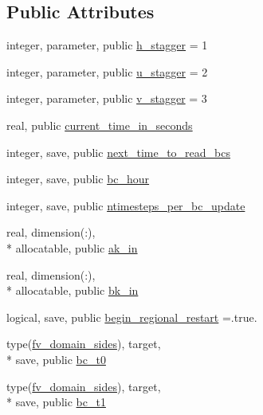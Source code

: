 \subsection*{Public Attributes}
\begin{DoxyCompactItemize}
\item 
integer, parameter, public \hyperlink{classfv__regional__mod_ab84d267f8311598530c8783263ad1bc8}{h\-\_\-stagger} = 1
\item 
integer, parameter, public \hyperlink{classfv__regional__mod_a6066b6d442bf60820ed3124997c2de88}{u\-\_\-stagger} = 2
\item 
integer, parameter, public \hyperlink{classfv__regional__mod_a279442c8a15e38c2db6957829cd5d594}{v\-\_\-stagger} = 3
\item 
real, public \hyperlink{classfv__regional__mod_acb12d0df0e8fb775d3a41fba0b0f34e9}{current\-\_\-time\-\_\-in\-\_\-seconds}
\item 
integer, save, public \hyperlink{classfv__regional__mod_a295cbf8a004fa34e95f2cca9358e0132}{next\-\_\-time\-\_\-to\-\_\-read\-\_\-bcs}
\item 
integer, save, public \hyperlink{classfv__regional__mod_a5192ede59906ab120d0ad1a12bcc9ea1}{bc\-\_\-hour}
\item 
integer, save, public \hyperlink{classfv__regional__mod_a4bc0673fc38c2310386939382a9c57ad}{ntimesteps\-\_\-per\-\_\-bc\-\_\-update}
\item 
real, dimension(\-:), \\*
allocatable, public \hyperlink{classfv__regional__mod_a75a74e2d8e60bc9cb7b1026601fbab5a}{ak\-\_\-in}
\item 
real, dimension(\-:), \\*
allocatable, public \hyperlink{classfv__regional__mod_ae7e070a83ea46499a4477fdbfbc7a9ce}{bk\-\_\-in}
\item 
logical, save, public \hyperlink{classfv__regional__mod_aa9895dcedb85e93e3ab4b513ec927084}{begin\-\_\-regional\-\_\-restart} =.true.
\item 
type(\hyperlink{structfv__regional__mod_1_1fv__domain__sides}{fv\-\_\-domain\-\_\-sides}), target, \\*
save, public \hyperlink{classfv__regional__mod_aa378b52fed4e1ce5559f939a10e55a1c}{bc\-\_\-t0}
\item 
type(\hyperlink{structfv__regional__mod_1_1fv__domain__sides}{fv\-\_\-domain\-\_\-sides}), target, \\*
save, public \hyperlink{classfv__regional__mod_acac95ec214236b8e748460a0132f03bc}{bc\-\_\-t1}

\end{DoxyCompactItemize}
